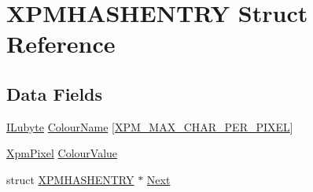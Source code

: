 \hypertarget{struct_x_p_m_h_a_s_h_e_n_t_r_y}{\section{X\-P\-M\-H\-A\-S\-H\-E\-N\-T\-R\-Y Struct Reference}
\label{struct_x_p_m_h_a_s_h_e_n_t_r_y}
}
\subsection*{Data Fields}
\begin{DoxyCompactItemize}
\item 
\hyperlink{il_8h_a8d2f04500100a86d1b00e98ab1b15a33}{I\-Lubyte} \hyperlink{struct_x_p_m_h_a_s_h_e_n_t_r_y_a6c12e83f591ef5b7f01f0bc49ef510de}{Colour\-Name} \mbox{[}\hyperlink{il__xpm_8c_a1a9efb764aaab8ff865c40e900f57330}{X\-P\-M\-\_\-\-M\-A\-X\-\_\-\-C\-H\-A\-R\-\_\-\-P\-E\-R\-\_\-\-P\-I\-X\-E\-L}\mbox{]}
\item 
\hyperlink{il__xpm_8c_a0122dcf9438a98ced0148ee1417530ce}{Xpm\-Pixel} \hyperlink{struct_x_p_m_h_a_s_h_e_n_t_r_y_acf7fbbc3981f642afb9e8be15c60589d}{Colour\-Value}
\item 
struct \hyperlink{struct_x_p_m_h_a_s_h_e_n_t_r_y}{X\-P\-M\-H\-A\-S\-H\-E\-N\-T\-R\-Y} $\ast$ \hyperlink{struct_x_p_m_h_a_s_h_e_n_t_r_y_a349596333e7264c7e9271d9c3e5ef2f4}{Next}
\end{DoxyCompactItemize}


